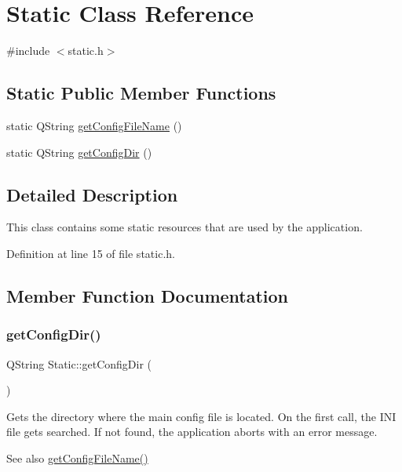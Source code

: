 \hypertarget{class_static}{}\section{Static Class Reference}
\label{class_static}


{\ttfamily \#include $<$static.\+h$>$}

\subsection*{Static Public Member Functions}
\begin{DoxyCompactItemize}
\item 
static Q\+String \mbox{\hyperlink{class_static_ad162fbe9bf85ea4cf5978fc61f6a0745}{get\+Config\+File\+Name}} ()
\item 
static Q\+String \mbox{\hyperlink{class_static_a50a826d3fd6baaa3acdcc8ae70a4e454}{get\+Config\+Dir}} ()
\end{DoxyCompactItemize}


\subsection{Detailed Description}
This class contains some static resources that are used by the application. 

Definition at line 15 of file static.\+h.



\subsection{Member Function Documentation}
\mbox{\label{class_static_a50a826d3fd6baaa3acdcc8ae70a4e454}} 
\subsubsection{\texorpdfstring{get\+Config\+Dir()}{getConfigDir()}}
{\footnotesize\ttfamily Q\+String Static\+::get\+Config\+Dir (\begin{DoxyParamCaption}{ }\end{DoxyParamCaption})\hspace{0.3cm}{\ttfamily [static]}}

Gets the directory where the main config file is located. On the first call, the I\+NI file gets searched. If not found, the application aborts with an error message. \begin{DoxySeeAlso}{See also}
\mbox{\hyperlink{class_static_ad162fbe9bf85ea4cf5978fc61f6a0745}{get\+Config\+File\+Name()}} 
\end{DoxySeeAlso}


